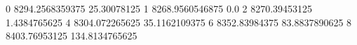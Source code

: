 0 8294.2568359375 25.30078125
1 8268.9560546875 0.0
2 8270.39453125 1.4384765625
4 8304.072265625 35.1162109375
6 8352.83984375 83.8837890625
8 8403.76953125 134.8134765625
